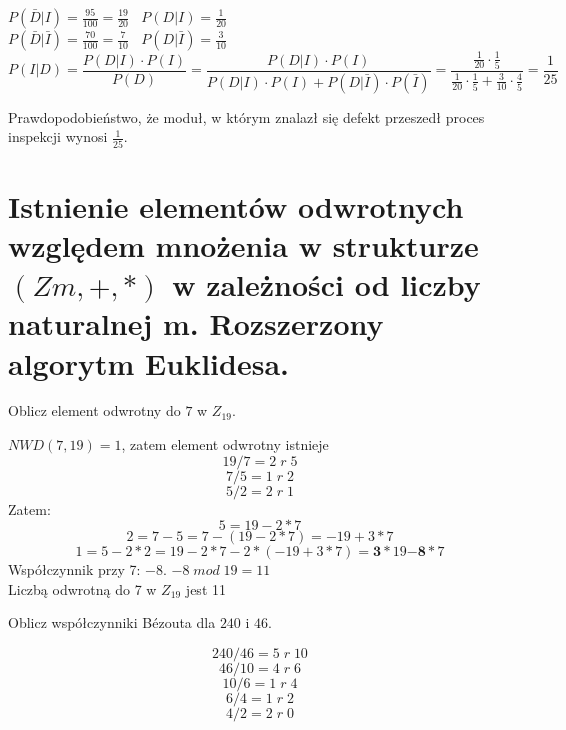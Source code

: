 \documentclass[12pt]{article}
\begin{document}
    $P(\bar{D}|I) = \frac{95}{100} = \frac{19}{20} ~ ~ ~ ~ P(D|I) = \frac{1}{20}$ \\

    $P(\bar{D}|\bar{I}) = \frac{70}{100} = \frac{7}{10} ~ ~ ~ ~ P(D|\bar{I}) = \frac{3}{10}$ \\

    \begin{equation*}
        P(I|D) = \frac{P(D|I)\cdot P(I)}{P(D)} = \frac{P(D|I)\cdot P(I)}{P(D|I)\cdot P(I) + P(D|\bar{I})\cdot P(\bar{I})} = \frac{\frac{1}{20}\cdot \frac{1}{5}}{\frac{1}{20}\cdot \frac{1}{5} + \frac{3}{10}\cdot \frac{4}{5}} = \frac{1}{25}
    \end{equation*}

    Prawdopodobieństwo, że moduł, w którym znalazł się defekt przeszedł proces inspekcji wynosi $\frac{1}{25}$.

    \newpage
    
    \section{Istnienie elementów odwrotnych względem mnożenia w strukturze $(Zm, +, *)$ w zależności od liczby naturalnej m. Rozszerzony algorytm Euklidesa.}
    \begin{exercise}
    Oblicz element odwrotny do $\mathrm{7}$ w $Z_{19}$.
    \end{exercise}
    
    $ NWD(7, 19) = 1 $, zatem element odwrotny istnieje
    $$19 / 7 = 2 \;r\; 5$$
    $$7 / 5 = 1 \;r\; 2$$
    $$5 / 2 = 2\; r\; 1$$
	Zatem:
    $$5 = 19 - 2  * 7$$
    $$2 = 7 - 5 = 7 - (19 - 2 * 7) = -19 + 3 * 7$$
    $$1 = 5 - 2 * 2 = 19 - 2 * 7 - 2 * (-19 + 3 * 7) = \mathbf{3} * 19 \mathbf{- 8} * 7$$
    Współczynnik przy 7: $-8$. $-8\; mod\; 19 = 11$\\
    Liczbą odwrotną do 7 w $Z_{19}$ jest 11
    \begin{exercise}
    Oblicz współczynniki Bézouta dla $\mathrm{240}$ i $\mathrm{46}$.
    \end{exercise}
    
    $$240 / 46 = 5 \;r\; 10$$
    $$46 / 10 = 4 \;r\; 6$$
    $$10 / 6 = 1 \;r\; 4$$
    $$6 / 4 = 1 \;r\; 2$$
    $$4 / 2 = 2 \;r\; 0$$
    
\end{document}
